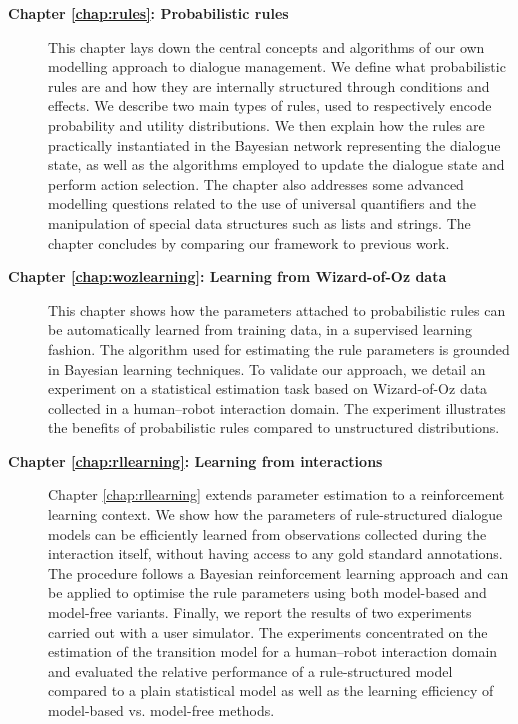 \begin{description}
  \item[\textbf{Chapter \ref{chap:rules}: Probabilistic rules}] \hfill \vspace{2mm}
 
  This chapter lays down the central concepts and algorithms of our own modelling approach to dialogue management. We define what probabilistic rules are and how they are internally structured through conditions and effects.  We describe two main types of rules, used to respectively encode probability and utility distributions. We then explain how the rules are practically instantiated in the Bayesian network representing the dialogue state, as well as the algorithms employed to update the dialogue state and perform action selection. The chapter also addresses some advanced modelling questions related to the use of universal quantifiers and the manipulation of special data structures such as lists and strings.  The chapter concludes by comparing our framework to previous work. \vspace{2mm}
  
  \item[\textbf{Chapter \ref{chap:wozlearning}: Learning from Wizard-of-Oz data}] \hfill  \vspace{2mm}
  
 This chapter shows how the parameters attached to probabilistic rules can be automatically learned from training data, in a supervised learning fashion. The algorithm used for estimating the rule parameters is grounded in Bayesian learning techniques.  To validate our approach, we detail an experiment on a statistical estimation task based on Wizard-of-Oz data collected in a human--robot interaction domain.  The experiment illustrates the benefits of probabilistic rules compared to unstructured distributions.  \vspace{2mm}

\item [\textbf{Chapter \ref{chap:rllearning}: Learning from interactions}] \hfill  \vspace{2mm}

Chapter \ref{chap:rllearning} extends parameter estimation to a reinforcement learning context.  We show how the parameters of rule-structured dialogue models can be efficiently learned from observations collected during the interaction itself, without having access to any gold standard annotations.  The procedure follows a Bayesian reinforcement learning approach and can be applied to optimise the rule parameters using both model-based and model-free variants. Finally, we report the results of two experiments carried out with a user simulator.  The experiments concentrated on the estimation of the transition model for a human--robot interaction domain and evaluated the relative performance of a rule-structured model compared to a plain statistical model as well as the learning efficiency of model-based vs. model-free methods.   \vspace{2mm}



\end{description}
